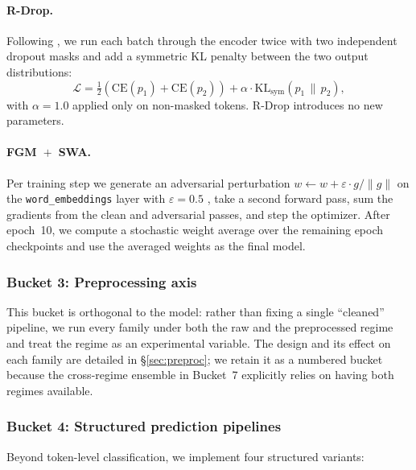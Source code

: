 \documentclass[11pt]{article}
\begin{document}
\paragraph{R-Drop.} Following \citet{liang2021rdrop}, we run each batch
through the encoder twice with two independent dropout masks and add a
symmetric KL penalty between the two output distributions:
\[
\mathcal{L} = \tfrac{1}{2}(\text{CE}(p_1) + \text{CE}(p_2))
              + \alpha\cdot\mathrm{KL}_{\mathrm{sym}}(p_1\,\|\,p_2),
\]
with $\alpha = 1.0$ applied only on non-masked tokens. R-Drop
introduces no new parameters.

\paragraph{FGM~$+$~SWA.} Per training step we generate an adversarial
perturbation $w \leftarrow w + \varepsilon\cdot g/\lVert g \rVert$ on the
\texttt{word\_embeddings} layer with $\varepsilon = 0.5$
\citep{miyato2017adversarial}, take a second forward pass, sum the
gradients from the clean and adversarial passes, and step the optimizer.
After epoch~10, we compute a stochastic weight average
\citep{izmailov2018swa} over the remaining epoch checkpoints and use the
averaged weights as the final model.

\subsubsection{Bucket 3: Preprocessing axis}
This bucket is orthogonal to the model: rather than fixing a single
``cleaned'' pipeline, we run every family under both the raw and the
preprocessed regime and treat the regime as an experimental variable.
The design and its effect on each family are detailed in
\S\ref{sec:preproc}; we retain it as a numbered bucket because the
cross-regime ensemble in Bucket~7 explicitly relies on having both
regimes available.

\subsubsection{Bucket 4: Structured prediction pipelines}

Beyond token-level classification, we implement four structured variants:
\end{document}
